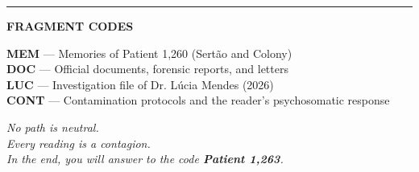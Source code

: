 \vspace{0.8em}

\noindent\rule{\textwidth}{0.5pt}
\vspace{0.6em}

\noindent\textbf{FRAGMENT CODES}

\vspace{0.3em}
\noindent\textcolor{mem}{\textbf{MEM}} --- Memories of Patient 1,260 (Sertão and Colony)\\[0.25em]
\textcolor{doc}{\textbf{DOC}} --- Official documents, forensic reports, and letters\\[0.25em]
\textcolor{luc}{\textbf{LUC}} --- Investigation file of Dr. Lúcia Mendes (2026)\\[0.25em]
\textcolor{cont}{\textbf{CONT}} --- Contamination protocols and the reader's psychosomatic response

\vspace{1.2em}
\begin{center}\itshape
No path is neutral.\\[0.2em]
Every reading is a contagion.\\[0.6em]
\upshape In the end, you will answer to the code \textbf{Patient 1,263}.
\end{center}

\endgroup
\clearpage
